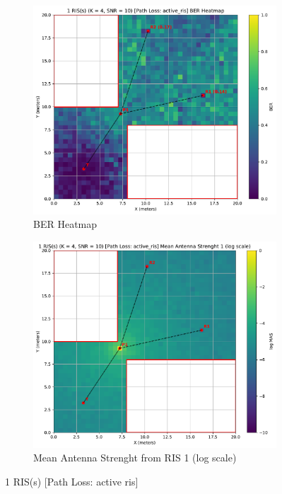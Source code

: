 \begin{figure}[H]
  \centering
  \begin{subfigure}[b]{0.48\textwidth}
    \centering
    \includegraphics[width=\textwidth]{imgs/heatmap-simulations/1 RIS(s) (K = 4, SNR = 10) [Path Loss: active_ris] BER Heatmap.pdf}
    \caption{BER Heatmap}
  \end{subfigure}
  \hfill
  \begin{subfigure}[b]{0.48\textwidth}
    \centering
    \includegraphics[width=\textwidth]{imgs/heatmap-simulations/1 RIS(s) (K = 4, SNR = 10) [Path Loss: active_ris] Mean Antenna Strenght 1 (log scale).pdf}
    \caption{Mean Antenna Strenght from RIS 1 (log scale)}
  \end{subfigure}
  \caption{1 RIS(s) [Path Loss: active ris]}
\end{figure}

